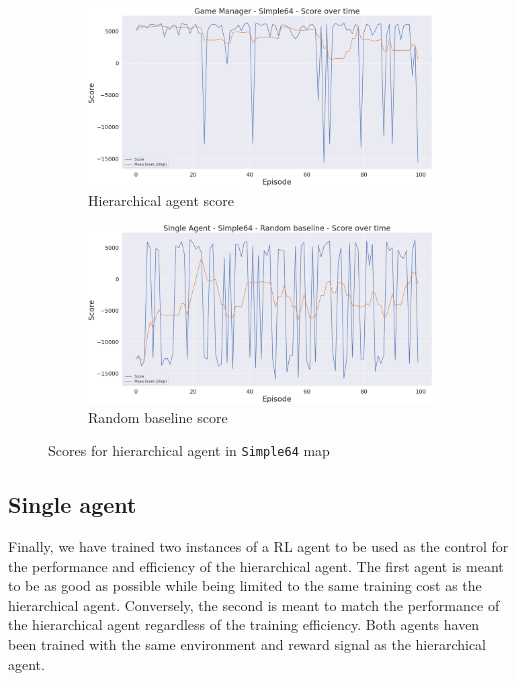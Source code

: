 \begin{figure}[t]
    \centering
    \begin{subfigure}[b]{0.48\textwidth}
        \includegraphics[width=1\textwidth]{figs/multi_dqn_game_manager/exploit/score.png}
        \caption{Hierarchical agent score}
    \end{subfigure}
    \hfill
    \begin{subfigure}[b]{0.48\textwidth}
        \includegraphics[width=1\textwidth]{figs/single_random/exploit/score.png}
        \caption{Random baseline score}
    \end{subfigure}
    \caption{Scores for hierarchical agent in \texttt{Simple64} map}
    \label{fig:hierarchical_Simple64_scores}
\end{figure}

\subsection{Single agent}

Finally, we have trained two instances of a RL agent to be used as the control for the performance and efficiency of the hierarchical agent. The first agent is meant to be as good as possible while being limited to the same training cost as the hierarchical agent. Conversely, the second is meant to match the performance of the hierarchical agent regardless of the training efficiency. Both agents haven been trained with the same environment and reward signal as the hierarchical agent.

